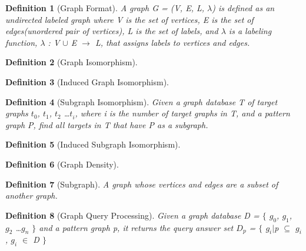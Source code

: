 \documentclass{l4proj}
\newtheorem{definition}{Definition}
\begin{document}
        \begin{definition}[Graph Format]
        \label{def:graphFormat}
        A graph G = (V, E, L, $\lambda$) is defined as an undirected labeled graph where V is the set of vertices, E is the set of edges(unordered pair of vertices), L is the set of labels, and $\lambda$ is a labeling function, $\lambda$ : V $\cup$ E $\rightarrow$ L, that assigns labels to vertices and edges.
        \end{definition}
        
        \begin{definition}[Graph Isomorphism]
        
        \end{definition}
        
        \begin{definition}[Induced Graph Isomorphism]
        \label{def:inducedGraphIsomorphism}
        
        \end{definition}

        \begin{definition}[Subgraph Isomorphism]
        \label{def:subgraphIsomorphism}
        Given a graph database T of target graphs $t^{}_0$, $t^{}_1$, $t^{}_2$ \ldots $t^{}_i$, where \textit{i} is the number of target graphs in T, and a pattern graph P, find all targets in T that have P as a subgraph.
        \end{definition}
        
        \begin{definition}[Induced Subgraph Isomorphism]
        \label{def:inducedSubgraphIsomorphism}
        
        \end{definition}
        
        \begin{definition}[Graph Density]
        
        \end{definition}
        
        \begin{definition}[Subgraph]
        \label{def:subgraph}
        A graph whose vertices and edges are a subset of another graph.
        \end{definition}
        
        \begin{definition}[Graph Query Processing]
        \label{def:graphQueryProcessing}
        Given a graph database D = $\{$ $g^{}_0$, $g^{}_1$, $g^{}_2$ \ldots $g^{}_n$ $\}$ and a pattern graph p, it returns the query answer set $D^{}_p$ = $\{$ $g^{}_i$$\vert$p $\subseteq$ $g^{}_i$, $g^{}_i$ $\in$ D $\}$
        
        \end{definition}
        
\end{document}

